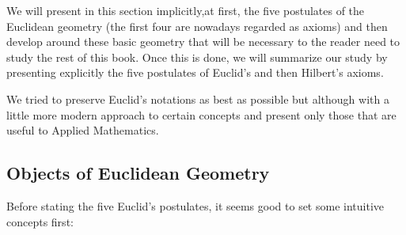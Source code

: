 We will present in this section implicitly,at first, the five postulates of the Euclidean geometry (the first four are nowadays regarded as axioms) and then develop around these basic geometry that will be necessary to the reader need to study the rest of this book. Once this is done, we will summarize our study by presenting explicitly the five postulates of Euclid's and then Hilbert's axioms.

	\begin{tcolorbox}[title=Remark,colframe=black,arc=10pt]
We tried to preserve Euclid's notations as best as possible but although with a little more modern approach to certain concepts and present only those that are useful to Applied Mathematics.
	\end{tcolorbox}
	
	\subsection{Objects of Euclidean Geometry}
	
	Before stating the five Euclid's postulates, it seems good to set some intuitive concepts first:
	
